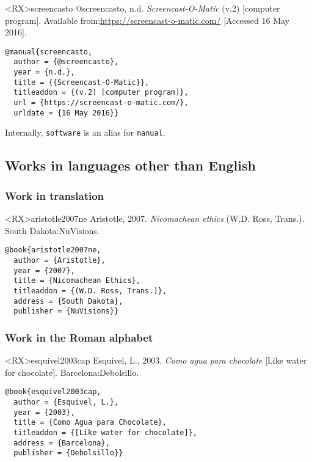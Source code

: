 \documentclass[10pt,a4paper]{article}
\newenvironment{info}{%
  \begin{list}{\makebox[2em][c]{\faInfoCircle}}{%
    \setlength{\leftmargin}{2em}
    \setlength{\labelwidth}{2em}
    \setlength{\labelsep}{0pt}}
}{\end{list}}
\begin{document}
\begin{bibexbox}<RX>{screencasto}
  @screencasto, n.d. \emph{Screencast-O-Matic} (v.2) [computer program]. Available from:\@ \url{https://screencast-o-matic.com/} [Accessed 16 May 2016].
  \tcblower
\begin{Verbatim}
@manual{screencasto,
  author = {@screencasto},
  year = {n.d.},
  title = {{Screencast-O-Matic}},
  titleaddon = {(v.2) [computer program]},
  url = {https://screencast-o-matic.com/},
  urldate = {16 May 2016}}
\end{Verbatim}
\end{bibexbox}

\begin{info}\item Internally, \texttt{software} is an alias for \texttt{manual}.\end{info}

\subsection{Works in languages other than English}

\subsubsection*{Work in translation}

\begin{bibexbox}<RX>{aristotle2007ne}
  Aristotle, 2007. \emph{Nicomachean ethics} (W.D. Ross, Trans.). South Dakota:\@ NuVisions.
  \tcblower
\begin{Verbatim}
@book{aristotle2007ne,
  author = {Aristotle},
  year = {2007},
  title = {Nicomachean Ethics},
  titleaddon = {(W.D. Ross, Trans.)},
  address = {South Dakota},
  publisher = {NuVisions}}
\end{Verbatim}
\end{bibexbox}

\subsubsection*{Work in the Roman alphabet}

\begin{bibexbox}<RX>{esquivel2003cap}
  Esquivel, L., 2003. \emph{Como agua para chocolate} [Like water for chocolate]. Barcelona:\@ Debolsillo.
  \tcblower
\begin{Verbatim}
@book{esquivel2003cap,
  author = {Esquivel, L.},
  year = {2003},
  title = {Como Agua para Chocolate},
  titleaddon = {[Like water for chocolate]},
  address = {Barcelona},
  publisher = {Debolsillo}}
\end{Verbatim}
\end{bibexbox}
\end{document}
